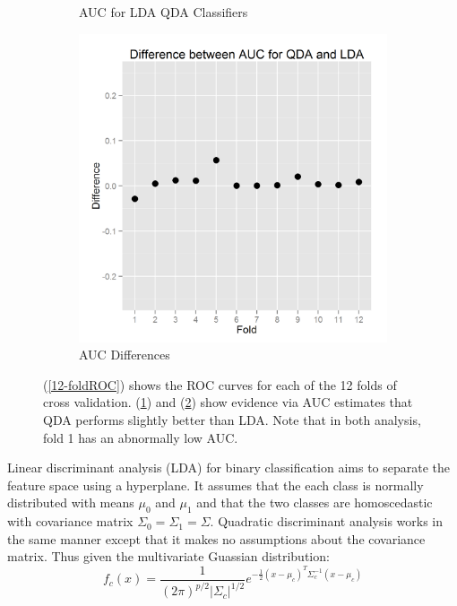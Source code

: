 \documentclass{article}\usepackage[]{graphicx}\usepackage[]{color}
\begin{document}
\begin{figure}[h]
\begin{subfigure}[b]{0.3\textwidth}
    \caption{AUC for LDA QDA Classifiers}
    \label{12-foldAUC}
  \end{subfigure}  
  \begin{subfigure}[b]{0.3\textwidth}
    \includegraphics[width=\linewidth]{AUC_difference.png}
    \caption{AUC Differences}
    \label{12-foldAUCdiff}
  \end{subfigure}    
  \caption{(\ref{12-foldROC}) shows the ROC curves for each of the 12 folds of cross validation.  (\ref{12-foldAUC}) and (\ref{12-foldAUCdiff}) show evidence via AUC estimates that QDA performs slightly better than LDA.  Note that in both analysis, fold 1 has an abnormally low AUC.}
  \label{fig:qda_lda}
\end{figure}
Linear discriminant analysis (LDA) for binary classification aims to separate the feature space using a hyperplane.  It assumes that the each class is normally distributed with means $\mu_0$ and $\mu_1$ and that the two classes are homoscedastic with covariance matrix $\Sigma_0=\Sigma_1=\Sigma$.  Quadratic discriminant analysis works in the same manner except that it makes no assumptions about the covariance matrix.  Thus given the multivariate Guassian distribution:
\begin{equation}
f_c(x) = \frac{1}{(2 \pi)^{p/2} \vert \Sigma_c \vert ^{1/2}} e^{-\frac{1}{2}(x-\mu_c)^T \Sigma_c^{-1} (x-\mu_c)}
\end{equation}
\end{document}
